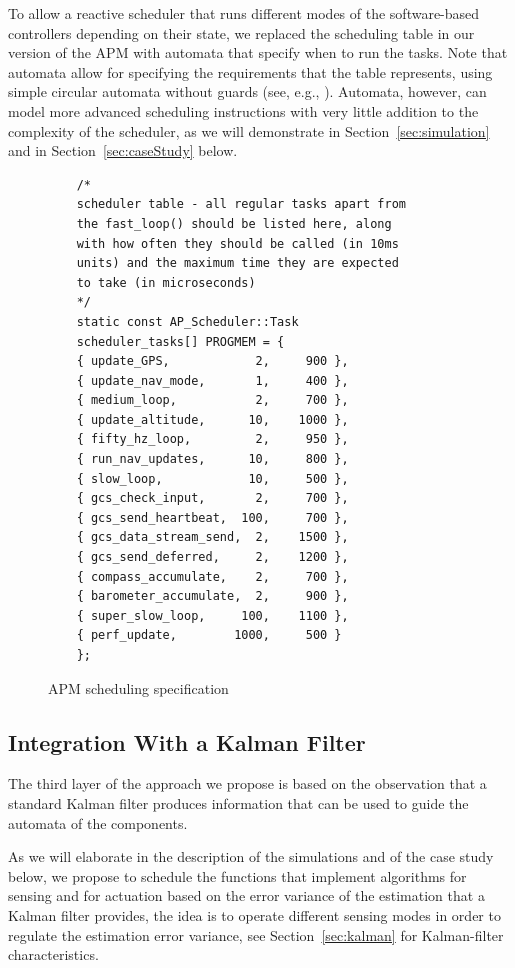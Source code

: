 \documentclass[ twoside, 12pt ]{article}
\begin{document}
To allow a reactive scheduler that runs different modes of the software-based controllers depending on their state, we replaced the scheduling table in our version of the APM with automata that specify when to run the tasks. Note that automata allow for specifying the requirements that the table represents, using simple circular automata without guards (see, e.g., \cite{weiss2007automata}). Automata, however, can model more advanced scheduling instructions with very little addition to the complexity of the scheduler, as we will demonstrate in Section~\ref{sec:simulation} and in Section~\ref{sec:caseStudy} below.

\begin{figure}[]
    \scriptsize
    \begin{lstlisting}
    /*
    scheduler table - all regular tasks apart from
    the fast_loop() should be listed here, along 
    with how often they should be called (in 10ms 
    units) and the maximum time they are expected 
    to take (in microseconds)
    */
    static const AP_Scheduler::Task 
    scheduler_tasks[] PROGMEM = {
    { update_GPS,            2,     900 },
    { update_nav_mode,       1,     400 },
    { medium_loop,           2,     700 },
    { update_altitude,      10,    1000 },
    { fifty_hz_loop,         2,     950 },
    { run_nav_updates,      10,     800 },
    { slow_loop,            10,     500 },
    { gcs_check_input,       2,     700 },
    { gcs_send_heartbeat,  100,     700 },
    { gcs_data_stream_send,  2,    1500 },
    { gcs_send_deferred,     2,    1200 },
    { compass_accumulate,    2,     700 },
    { barometer_accumulate,  2,     900 },
    { super_slow_loop,     100,    1100 },
    { perf_update,        1000,     500 }
    };
    \end{lstlisting}
    \caption{APM scheduling specification}
    \label{fig:apm-scheduler} 
\end{figure}

\subsection{Integration With a Kalman Filter}
The third layer of the approach we propose is based on the observation that a standard Kalman filter produces information that can be used to guide the automata of the components. 

As we will elaborate in the description of the simulations and of the case study below, we propose to schedule the functions that implement algorithms for sensing and for actuation based on the error variance of the estimation that a Kalman filter provides, the idea is to operate different sensing modes in order to regulate the estimation error variance, see Section~\ref{sec:kalman} for Kalman-filter characteristics. 
\end{document}

